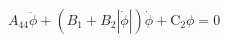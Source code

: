 \begin{equation} \label{eq:roll_decay_equation_himeno_quadratic}
A_{44} \ddot{\phi} + \left(B_{1} + B_{2} \left|{\dot{\phi}}\right|\right) \dot{\phi} + \operatorname{C_{2}} \phi = 0
\end{equation}
